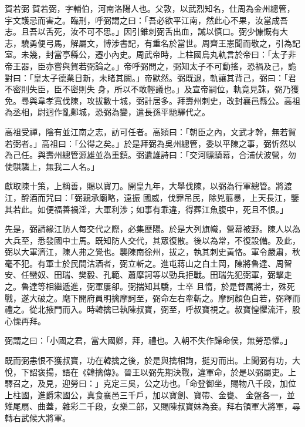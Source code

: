 \begin{pinyinscope}
 賀若弼
 賀若弼，字輔伯，河南洛陽人也。父敦，以武烈知名，仕周為金州總管，宇文護忌而害之。臨刑，呼弼謂之曰：「吾必欲平江南，然此心不果，汝當成吾志。且吾以舌死，汝不可不思。」因引錐刺弼舌出血，誡以慎口。弼少慷慨有大志，驍勇便弓馬，解屬文，博涉書記，有重名於當世。周齊王憲聞而敬之，引為記室。未幾，封當亭縣公，遷小內史。周武帝時，上柱國烏丸軌言於帝曰：「太子非帝王器，臣亦嘗與賀若弼論之。」帝呼弼問之，弼知太子不可動搖，恐禍及己，詭對曰：「皇太子德業日新，未睹其闕。」帝默然。弼既退，軌讓其背己，弼曰：「君不密則失臣，臣不密則失
 身，所以不敢輕議也。」及宣帝嗣位，軌竟見誅，弼乃獲免。尋與韋孝寬伐陳，攻拔數十城，弼計居多。拜壽州刺史，改封襄邑縣公。高祖為丞相，尉迥作亂鄴城，恐弼為變，遣長孫平馳驛代之。



 高祖受禪，陰有並江南之志，訪可任者。高熲曰：「朝臣之內，文武才幹，無若賀若弼者。」高祖曰：「公得之矣。」於是拜弼為吳州總管，委以平陳之事，弼忻然以為己任。與壽州總管源雄並為重鎮。弼遺雄詩曰：「交河驃騎幕，合浦伏波營，勿使騏驎上，無我二人名。」



 獻取陳十策，上稱善，賜以寶刀。開皇九年，大舉伐陳，以弼為行軍總管。將渡江，酹酒而咒曰：「弼親承廟略，遠振
 國威，伐罪吊民，除兇翦暴，上天長江，鑒其若此。如便福善禍淫，大軍利涉；如事有乖違，得葬江魚腹中，死且不恨。」



 先是，弼請緣江防人每交代之際，必集歷陽。於是大列旗幟，營幕被野。陳人以為大兵至，悉發國中士馬。既知防人交代，其眾復散。後以為常，不復設備。及此，弼以大軍濟江，陳人弗之覺也。襲陳南徐州，拔之，執其刺史黃恪。軍令嚴肅，秋毫不犯。有軍士於民間沽酒者，弼立斬之。進屯蔣山之白土岡，陳將魯達、周智安、任蠻奴、田瑞、樊毅、孔範、蕭摩訶等以勁兵拒戰。田瑞先犯弼軍，弼擊走之。魯達等相繼遞進，弼軍屢卻。弼揣知其驕，士卒
 且惰，於是督厲將士，殊死戰，遂大破之。麾下開府員明擒摩訶至，弼命左右牽斬之。摩訶顏色自若，弼釋而禮之。從北掖門而入。時韓擒已執陳叔寶，弼至，呼叔寶視之。叔寶惶懼流汗，股心慄再拜。



 弼謂之曰：「小國之君，當大國卿，拜，禮也。入朝不失作歸命侯，無勞恐懼。」



 既而弼恚恨不獲叔寶，功在韓擒之後，於是與擒相詢，挺刃而出。上聞弼有功，大悅，下詔褒揚，語在《韓擒傳》。晉王以弼先期決戰，違軍命，於是以弼屬吏。上驛召之，及見，迎勞曰：」克定三吳，公之功也。「命登御坐，賜物八千段，加位上柱國，進爵宋國公，真食襄邑三千戶，加以寶劍、寶帶、金甕、
 金盤各一，並雉尾扇、曲蓋，雜彩二千段，女樂二部，又賜陳叔寶妹為妾。拜右領軍大將軍，尋轉右武候大將軍。




\end{pinyinscope}
